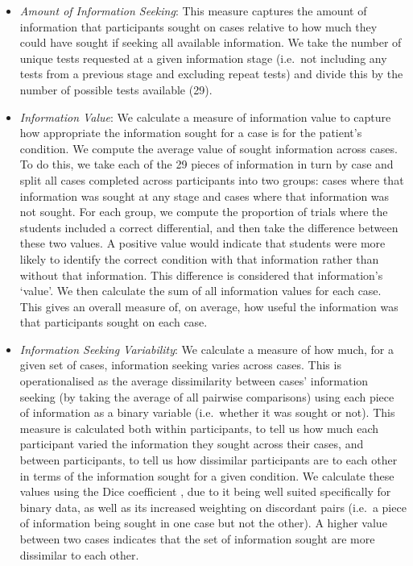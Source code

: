 \documentclass[a4paper, nobind]{templates/ociamthesis}
\begin{document}
\begin{itemize}
\item
  \emph{Amount of Information Seeking}: This measure captures the amount of information that participants sought on cases relative to how much they could have sought if seeking all available information. We take the number of unique tests requested at a given information stage (i.e.~not including any tests from a previous stage and excluding repeat tests) and divide this by the number of possible tests available (29).
\item
  \emph{Information Value}: We calculate a measure of information value to capture how appropriate the information sought for a case is for the patient's condition. We compute the average value of sought information across cases. To do this, we take each of the 29 pieces of information in turn by case and split all cases completed across participants into two groups: cases where that information was sought at any stage and cases where that information was not sought. For each group, we compute the proportion of trials where the students included a correct differential, and then take the difference between these two values. A positive value would indicate that students were more likely to identify the correct condition with that information rather than without that information. This difference is considered that information's `value'. We then calculate the sum of all information values for each case. This gives an overall measure of, on average, how useful the information was that participants sought on each case.
\item
  \emph{Information Seeking Variability}: We calculate a measure of how much, for a given set of cases, information seeking varies across cases. This is operationalised as the average dissimilarity between cases' information seeking (by taking the average of all pairwise comparisons) using each piece of information as a binary variable (i.e.~whether it was sought or not). This measure is calculated both within participants, to tell us how much each participant varied the information they sought across their cases, and between participants, to tell us how dissimilar participants are to each other in terms of the information sought for a given condition. We calculate these values using the Dice coefficient \autocite{dice_measures_1945}, due to it being well suited specifically for binary data, as well as its increased weighting on discordant pairs (i.e.~a piece of information being sought in one case but not the other). A higher value between two cases indicates that the set of information sought are more dissimilar to each other.
\end{itemize}
\end{document}
